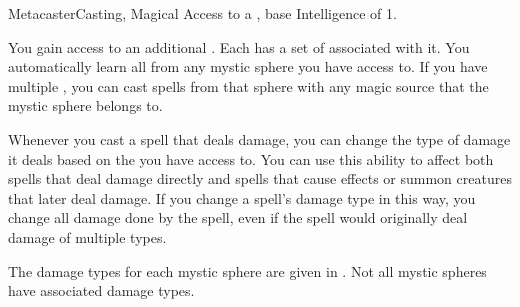     \begin{feat}{Metacaster}{Casting, Magical}
        \featpre Access to a , base Intelligence of 1.

         You gain access to an additional .
        Each  has a set of  associated with it.
        You automatically learn all  from any mystic sphere you have access to.
        If you have multiple , you can cast spells from that sphere with any magic source that the mystic sphere belongs to.

         Whenever you cast a spell that deals damage, you can change the type of damage it deals based on the  you have access to.
        You can use this ability to affect both spells that deal damage directly and spells that cause effects or summon creatures that later deal damage.
        If you change a spell's damage type in this way, you change all damage done by the spell, even if the spell would originally deal damage of multiple types.

        The damage types for each mystic sphere are given in .
        Not all mystic spheres have associated damage types.


\end{feat}
